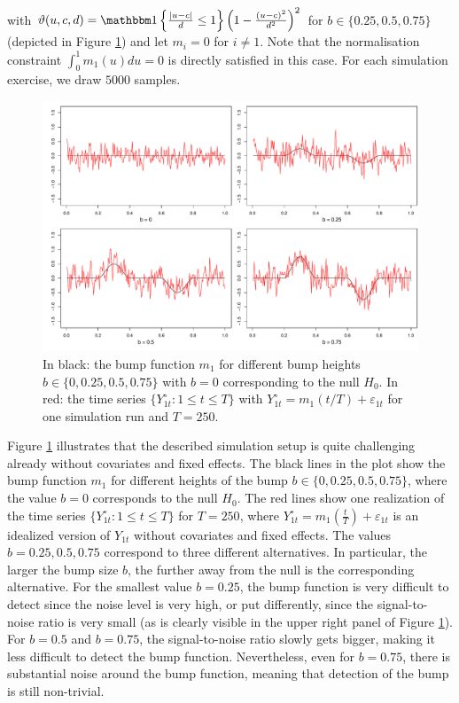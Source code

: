 \documentclass[12pt]{article}
\begin{document}
with $\vartheta(u,c,d) =  \ind\left\{\frac{|u - c|}{d}\leq 1\right\} \left(1 - \frac{(u - c)^2}{d^2}\right)^2$ for $b \in \{ 0.25, 0.5, 0.75 \}$ (depicted in Figure \ref{fig:bump_function}) and let $m_i = 0$ for $i \neq 1$. Note that the normalisation constraint $\int_0^1 m_1(u) du = 0$ is directly satisfied in this case. For each simulation exercise, we draw $5000$ samples.


\begin{figure}[t!]
\includegraphics[width=\textwidth]{../output/bump_function.pdf}
\caption{In black: the bump function $m_1$ for different bump heights $b \in \{0, 0.25, 0.5, 0.75\}$ with $b=0$ corresponding to the null $H_0$. In red: the time series $\{Y_{1t}^\circ : 1 \le t \le T \}$ with $Y_{1t}^\circ = m_1(t/T) + \varepsilon_{1t}$ for one simulation run and $T=250$.}\label{fig:bump_function}
\end{figure}


Figure \ref{fig:bump_function} illustrates that the described simulation setup is quite challenging already without covariates and fixed effects. The black lines in the plot show the bump function $m_1$ for different heights of the bump $b \in \{0, 0.25, 0.5, 0.75\}$, where the value $b=0$ corresponds to the null $H_0$. The red lines show one realization of the time series $\{Y_{1t}^\circ:1 \le t \le T \}$ for $T=250$, where $Y_{1t}^\circ = m_1(\frac{t}{T}) + \varepsilon_{1t}$ is an idealized version of $Y_{1t}$ without covariates and fixed effects. The values $b=0.25,0.5,0.75$ correspond to three different alternatives. In particular, the larger the bump size $b$, the further away from the null is the corresponding alternative. For the smallest value $b=0.25$, the bump function is very difficult to detect since the noise level is very high, or put differently, since the signal-to-noise ratio is very small (as is clearly visible in the upper right panel of Figure \ref{fig:bump_function}). For $b=0.5$ and $b=0.75$, the signal-to-noise ratio slowly gets bigger, making it less difficult to detect the bump function. Nevertheless, even for $b=0.75$, there is substantial noise around the bump function, meaning that detection of the bump is still non-trivial. 
\end{document}

